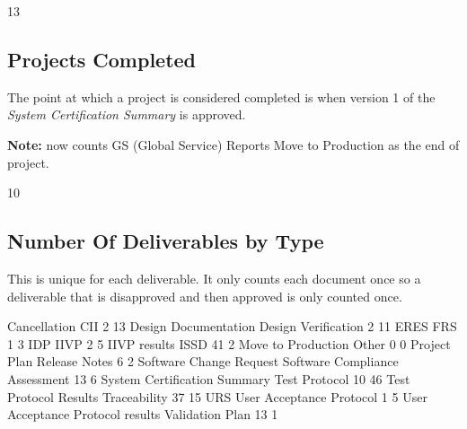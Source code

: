 \documentclass{article}
\begin{document}
\begin{Schunk}
\begin{Soutput}
[1] 13
\end{Soutput}
\end{Schunk}

\subsection{Projects Completed}

The point at which a project is considered completed is when version 1 of the
\textit{System Certification Summary} is approved.

\textbf{Note:} now counts GS (Global Service) Reports Move to Production as the end
of project.

\begin{Schunk}
\begin{Soutput}
[1] 10
\end{Soutput}
\end{Schunk}


\subsection{Number Of Deliverables by Type}
This is unique for each deliverable. It only counts each document once so a deliverable
that is disapproved and then approved is only counted once.

\begin{Schunk}
\begin{Soutput}
                    Cancellation                              CII 
                               2                               13 
            Design Documentation              Design Verification 
                               2                               11 
                            ERES                              FRS 
                               1                                3 
                             IDP                             IIVP 
                               2                                5 
                    IIVP results                             ISSD 
                              41                                2 
              Move to Production                            Other 
                               0                                0 
                    Project Plan                    Release Notes 
                               6                                2 
         Software Change Request   Software Compliance Assessment 
                              13                                6 
    System Certification Summary                    Test Protocol 
                              10                               46 
           Test Protocol Results                     Traceability 
                              37                               15 
                             URS         User Acceptance Protocol 
                               1                                5 
User Acceptance Protocol results                  Validation Plan 
                              13                                1 
\end{Soutput}
\end{Schunk}
\end{document}
